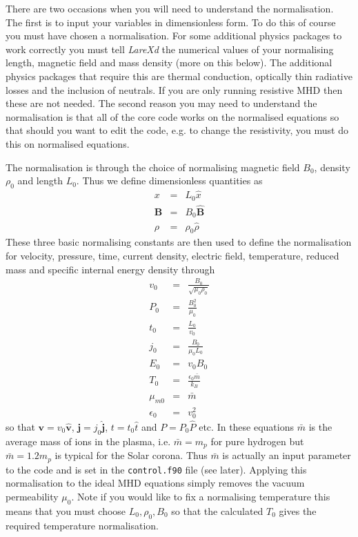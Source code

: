 \documentclass[11pt]{article}
\begin{document}
There are two occasions when you will need to understand the normalisation. The first is to input your variables in dimensionless form. To do this of course you must have chosen a normalisation. For some additional physics packages to work correctly you must tell {\it LareXd} the numerical values of your normalising length, magnetic field and mass density (more on this below). The additional physics packages that require this are thermal conduction, optically thin radiative losses and the inclusion of neutrals. If you are only running resistive MHD then these are not needed. The second reason you may need to understand the normalisation is that all of the core code works on the normalised equations so that should you want to edit the code, e.g. to change the resistivity, you must do this on normalised equations.

The normalisation is through the choice of normalising magnetic field $B_0$, density $\rho_0$ and length $L_0$. Thus we define dimensionless quantities as
\begin{eqnarray*}
x&=&L_0 \hat{x}\\
\mathbf{B}&=&B_0\hat{\mathbf{B}} \\
\rho&=&\rho_0 \hat{\rho}
\end{eqnarray*}
These three basic normalising constants are then used to define the normalisation for velocity, pressure, time, current density, electric field, temperature, reduced mass and specific internal energy density through
\begin{eqnarray*}
v_{0}&=&\frac{B_{0}}{\sqrt{\mu_{0}\rho_{0}}}\\
P_{0}&=&\frac{B^{2}_{0}}{\mu_{0}} \\
t_0&=&\frac{L_0}{v_0}\\
j_{0}&=&\frac{B_{0}}{\mu_{0}L_{0}}\\
E_0&=&v_0 B_0\\
T_0&=&\frac{\epsilon_0 \bar{m}}{k_B}\\
\mu_{m0}&=&\bar{m}\\
\epsilon_0&=&v_0^2
\end{eqnarray*}
so that $\mathbf{v}=v_0\hat{\mathbf{v}}$, $\mathbf{j}=j_0\hat{\mathbf{j}}$, $t=t_0\hat{t}$ and $P=P_0\hat{P}$ etc. In these equations $\bar{m}$ is the average mass of ions in the plasma, i.e. $\bar{m}=m_p$ for pure hydrogen but  $\bar{m}=1.2 m_p$ is typical for the Solar corona. Thus $\bar{m}$ is actually an input parameter to the code and is set in the \texttt{control.f90} file (see later). Applying this normalisation to the ideal MHD equations simply removes the vacuum permeability $\mu_0$. Note if you would like to fix a normalising temperature this means that you must choose $L_0,\rho_0, B_0$ so that the calculated $T_0$ gives the required temperature normalisation.
\end{document}
